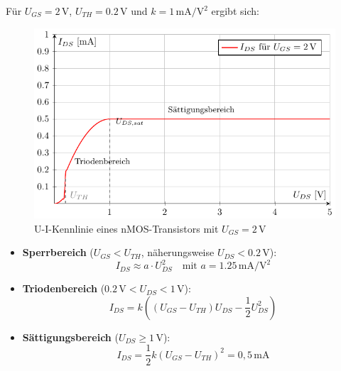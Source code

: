 \documentclass[oneside]{scrarticle}
\numberwithin{equation}{section}
\begin{document}
Für \( U_{GS} = 2\,\mathrm{V} \), \( U_{TH} = 0.2\,\mathrm{V} \) und \( k = 1\,\mathrm{mA/V^2} \) ergibt sich:
\begin{figure}[h]
	\centering
	\label{fig:kennlinie}
	\includegraphics[scale=1.0]{tkiz/ui-kennlinie.pdf}
	\caption{U-I-Kennlinie eines nMOS-Transistors mit $U_{GS} = 2\,\mathrm{V}$}
\end{figure}
\begin{itemize}
	\item \textbf{Sperrbereich} ($U_{GS} < U_{TH}$, näherungsweise $U_{DS} < 0.2\,\mathrm{V}$): \\
	\[
	I_{DS} \approx a \cdot U_{DS}^2 \quad \text{mit } a = 1.25\,\mathrm{mA/V^2}
	\]
	\item \textbf{Triodenbereich} ($0.2\,\mathrm{V} < U_{DS} < 1\,\mathrm{V}$): \\
	\[
	I_{DS} = k \left((U_{GS} - U_{TH}) U_{DS} - \frac{1}{2} U_{DS}^2\right)
	\]
	\item \textbf{Sättigungsbereich} ($U_{DS} \ge 1\,\mathrm{V}$): \\
	\[
	I_{DS} = \frac{1}{2} k (U_{GS} - U_{TH})^2 = 0{,}5\,\mathrm{mA}
	\]
\end{itemize}
\end{document}
